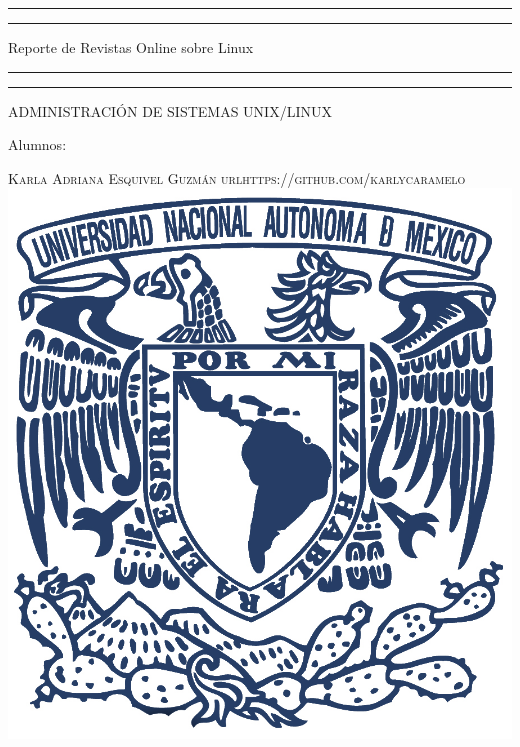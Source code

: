 \documentclass[a4paper, 11pt, oneside]{article}
\begin{document}
 

\begin{titlepage} 

	\centering 
	
	\scshape 
	
	\vspace*{\baselineskip} 
	
	
	
	\rule{\textwidth}{1.6pt}\vspace*{-\baselineskip}\vspace*{2pt} 
	\rule{\textwidth}{0.4pt} 
	
	\vspace{0.75\baselineskip} 
	
	{\LARGE Reporte de Revistas Online sobre Linux}	
	\vspace{0.75\baselineskip} 
	
	\rule{\textwidth}{0.4pt}\vspace*{-\baselineskip}\vspace{3.2pt}
	\rule{\textwidth}{1.6pt} 
	
	\vspace{2\baselineskip} 
	

	ADMINISTRACIÓN DE SISTEMAS UNIX/LINUX
	
	\vspace*{3\baselineskip} 
	
	
	
	Alumnos:
	
	\vspace{0.5\baselineskip} 
	
	{\scshape\Large Karla Adriana Esquivel Guzmán url{https://github.com/karlycaramelo} \\}
	\vspace{0.5\baselineskip} 
	\vfill
	\includegraphics[scale=0.80]{unam.jpg}
	

\end{titlepage}
\end{document}
